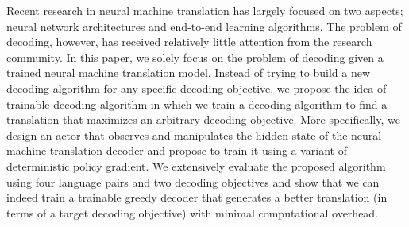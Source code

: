 Recent research in neural machine translation has largely focused on two aspects; neural network architectures and end-to-end learning algorithms. The problem of decoding, however, has received relatively little attention from the research community. In this paper, we solely focus on the problem of decoding given a trained neural machine translation model. Instead of trying to build a new decoding algorithm for any specific decoding objective, we propose the idea of trainable decoding algorithm in which we train a decoding algorithm to find a translation that maximizes an arbitrary decoding objective. More specifically, we design an actor that observes and manipulates the hidden state of the neural machine translation decoder and propose to train it using a variant of deterministic policy gradient. We extensively evaluate the proposed algorithm using four language pairs and two decoding objectives and show that we can indeed train a trainable greedy decoder that generates a better translation (in terms of a target decoding objective) with minimal computational overhead.
